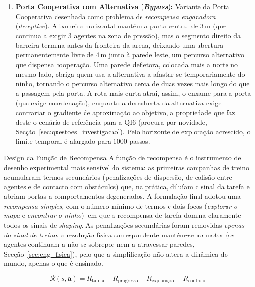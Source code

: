 \documentclass[12pt,reqno, twoside]{amsbook}
\makeatletter
\def\section{\@startsection{section}{1}%
      \z@{.5\linespacing\@plus.7\linespacing}{.25\linespacing}%
      {\normalfont\bfseries\flushleft}}
\theoremstyle{plain}
\numberwithin{equation}{chapter}
\numberwithin{section}{chapter}
\numberwithin{table}{chapter}
\numberwithin{figure}{chapter}
\makeatother
\begin{document}
\begin{enumerate}
    \item \textbf{Porta Cooperativa com Alternativa (\textit{Bypass}):} Variante da Porta Cooperativa desenhada como problema de \emph{recompensa enganadora} (\textit{deceptive}). A barreira horizontal mantém a porta central de $3$\,m (que continua a exigir 3 agentes na zona de pressão), mas o segmento direito da barreira termina antes da fronteira da arena, deixando uma abertura permanentemente livre de $4$\,m junto à parede leste, um percurso alternativo que dispensa cooperação. Uma parede defletora, colocada mais a norte no mesmo lado, obriga quem usa a alternativa a afastar-se temporariamente do ninho, tornando o percurso alternativo cerca de duas vezes mais longo do que a passagem pela porta. A rota mais curta atrai, assim, o enxame para a porta (que exige coordenação), enquanto a descoberta da alternativa exige contrariar o gradiente de aproximação ao objetivo, a propriedade que faz deste o cenário de referência para a QI6 (procura por novidade, Secção~\ref{sec:questoes_investigacao}). Pelo horizonte de exploração acrescido, o limite temporal é alargado para $1000$ passos.
\end{enumerate}

\section{Design da Função de Recompensa}
\label{sec:reward_design}
A função de recompensa é o instrumento de desenho experimental mais sensível do sistema: as primeiras campanhas de treino acumularam termos secundários (penalizações de dispersão, de colisão entre agentes e de contacto com obstáculos) que, na prática, diluíam o sinal da tarefa e abriam portas a comportamentos degenerados. A formulação final adotou uma \emph{recompensa simples}, com o número mínimo de termos e dois focos (\emph{explorar o mapa} e \emph{encontrar o ninho}), em que a recompensa de tarefa domina claramente todos os sinais de \textit{shaping}. As penalizações secundárias foram removidas \emph{apenas do sinal de treino}: a resolução física correspondente mantém-se no motor (os agentes continuam a não se sobrepor nem a atravessar paredes, Secção~\ref{sec:eng_fisica}), pelo que a simplificação não altera a dinâmica do mundo, apenas o que é ensinado.

\begin{equation}
    \mathcal{R}(s, \mathbf{a}) = R_{\text{tarefa}} + R_{\text{progresso}} + R_{\text{exploração}} - R_{\text{controlo}}
\end{equation}
\end{document}

